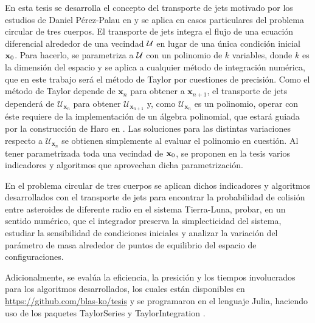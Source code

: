 En esta tesis se desarrolla el concepto del transporte de jets motivado por los estudios de Daniel Pérez-Palau en \cite{Perez2013, Perez2015} y se aplica en casos particulares del problema circular de tres cuerpos. El transporte de jets integra el flujo de una ecuación diferencial alrededor de una vecindad $\mathcal{U}$ en lugar de una única  condición inicial $\mathbf{x}_0$. Para hacerlo, se parametriza a $\mathcal{U}$ con un polinomio de $k$ variables, donde $k$ es la dimensión del espacio y se aplica a cualquier método de integración numérica, que en este trabajo será el método de Taylor por cuestiones de precisión. Como el método de Taylor depende de $\mathbf{x}_n$ para obtener a $\mathbf{x}_{n+1}$, el transporte de jets dependerá de $\mathcal{U}_{\mathbf{x}_n}$ para obtener $\mathcal{U}_{\mathbf{x}_{n+1}}$ y, como $\mathcal{U}_{\mathbf{x}_n}$ es un polinomio, operar con éste requiere de la implementación de un álgebra polinomial, que estará guiada por la construcción de Haro en \cite{Haro2009}. Las soluciones para las distintas variaciones respecto a $\mathcal{U}_{\mathbf{x}_n}$ se obtienen simplemente al evaluar el polinomio en cuestión. Al tener parametrizada toda una vecindad de $\mathbf{x}_0$, se proponen en la tesis varios indicadores y algoritmos que aprovechan dicha parametrización.

En el problema circular de tres cuerpos se aplican dichos indicadores y algoritmos desarrollados con el transporte de jets para encontrar la probabilidad de colisión entre asteroides de diferente radio en el sistema Tierra-Luna, probar, en un sentido numérico, que el integrador preserva la simplecticidad del sistema, estudiar la sensibilidad de condiciones iniciales y analizar la variación del parámetro de masa alrededor de puntos de equilibrio del espacio de configuraciones.  

Adicionalmente, se evalúa la eficiencia, la presición y los tiempos involucrados para los algoritmos desarrollados, los cuales están disponibles en \href{https://github.com/blas-ko/tesis}{https://github.com/blas-ko/tesis} y se programaron en el lenguaje Julia, haciendo uso de los paquetes \textsf{TaylorSeries} \cite{TaylorSeries} y \textsf{TaylorIntegration} \cite{TaylorIntegration}. 
